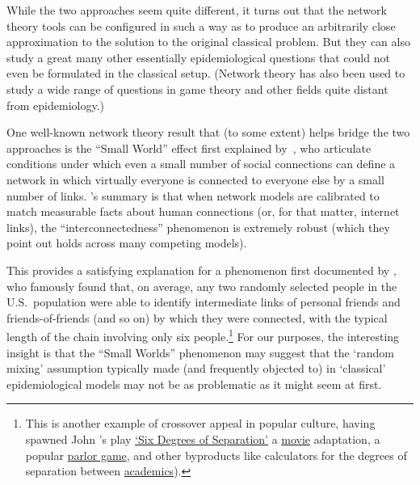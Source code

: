     While the two approaches seem quite different, it turns out that the network theory tools can be configured in such a way as to produce an arbitrarily close approximation to the solution to the original classical problem.  But they can also study a great many other essentially epidemiological questions that could not even be formulated in the classical setup.  (Network theory has also been used to study a wide range of questions in game theory and other fields quite distant from epidemiology.)


    One well-known network theory result that (to some extent) helps bridge the two approaches is the ``Small World'' effect first explained by~\cite{wsSmallWorld}, who articulate conditions under which even a small number of social connections can define a network in which virtually everyone is connected to everyone else by a small number of links.  \cite{barabasi2016network}'s summary is that when network models are calibrated to match measurable facts about human connections (or, for that matter, internet links), the ``interconnectedness'' phenomenon is extremely robust (which they point out holds across many competing models).

    This provides a satisfying explanation for a phenomenon first documented by \cite{milgram1967small}, who famously found that, on average, any two randomly selected people in the U.S.\ population were able to identify intermediate links of personal friends and friends-of-friends (and so on) by which they were connected, with the typical length of the chain involving only six people.\footnote{This is another example of crossover appeal in popular culture, having spawned John \cite{guareSixDegrees}'s play \href{https://en.wikipedia.org/wiki/Six_Degrees_of_Separation_(play)}{`Six Degrees of Separation'} a  \href{https://en.wikipedia.org/wiki/Six_Degrees_of_Separation_(film)}{movie} adaptation, a popular \href{https://en.wikipedia.org/wiki/Six_Degrees_of_Kevin_Bacon}{parlor game}, and other byproducts like calculators for the degrees of separation between \href{https://oakland.edu/enp/}{academics}).}  For our purposes, the interesting insight is that the ``Small Worlds'' phenomenon may suggest that the `random mixing' assumption typically made (and frequently objected to) in `classical' epidemiological models may not be as problematic as it might seem at first.

